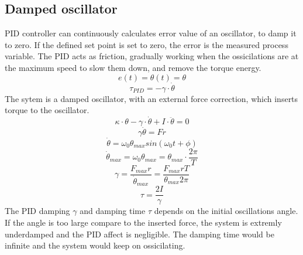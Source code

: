 \documentclass[\main/master.tex]{subfiles}
\begin{document}
\subsection{Damped oscillator}
PID controller can continuously calculates error value of an oscillator, to damp it to zero. If the defined set point is set to zero, the error is the measured process variable. The PID acts as friction, gradually working when the ossicilations are at the maximum speed to slow them down, and remove the torque energy.
\begin{equation}
e(t) = \theta(t) = \theta   \label{eqn:error}
\end{equation}
\begin{equation}
\tau_{PID} = -\gamma\cdot\dot{\theta}   \label{eqn:friction_torque}
\end{equation}
The sytem is a damped oscillator, with an external force correction, which inserts torque to the oscillator.
\begin{equation}
\kappa\cdot\theta - \gamma\cdot\dot{\theta}  + I\cdot\ddot{\theta} = 0   \label{eqn:damped__pid_motion_equation}
\end{equation}
\begin{equation}
\gamma\dot{\theta}  = Fr   \label{eqn:damped__pid_motion_equation}
\end{equation}
\begin{equation}
\dot{\theta} = \omega_0\theta_{max}sin(\omega_0 t +\phi)    \label{eqn:undamped_motion_equation}
\end{equation}
\begin{equation}
\dot{\theta}_{max} = \omega_0\theta_{max} = \theta_{max}\cdot\frac{2\pi}{T}    \label{eqn:undamped_motion_equation}
\end{equation}
\begin{equation}
\gamma  = \frac{F_{max}r}{\dot{\theta}_{max}} =\frac{F_{max}rT}{\theta_{max}2\pi}    \label{eqn:damped_pid_motion_equation}
\end{equation}
\begin{equation}
\tau =  \frac{2I}{\gamma}  \label{eqn:damping_time}
\end{equation}
The PID damping $\gamma$ and damping time $\tau$ depends on the initial oscillations angle. If the angle is too large compare to the inserted force, the system is extremly underdamped and the PID affect is negligible. The damping time would be infinite and the system would keep on ossicilating.
\end{document}
